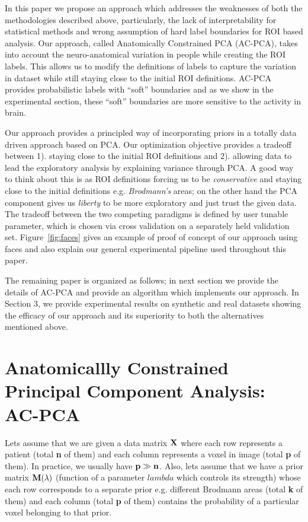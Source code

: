 \documentclass{llncs}
\begin{document}
In this paper we propose an approach which addresses the weaknesses of both the methodologies described above, particularly, the lack of interpretability for statistical methods and wrong assumption of hard label boundaries for ROI based analysis. Our approach, called Anatomically Constrained PCA (AC-PCA),  takes into account the neuro-anatomical variation in people while creating the ROI labels. This allows us to modify the definitions of labels to capture the variation in dataset while still staying close to the initial ROI definitions. AC-PCA provides probabilistic labels with ``soft'' boundaries and as we show in the experimental section, these ``soft'' boundaries are more sensitive to the activity in brain.

Our approach provides a principled way of incorporating priors in a totally data driven approach based on PCA. Our optimization objective provides a tradeoff between 1). staying close to the initial ROI definitions and 2). allowing data to lead the exploratory analysis by explaining variance through PCA. A good way to think about this is as ROI definitions forcing us to be {\em conservative} and staying close to the initial definitions e.g. {\it Brodmann's} areas; on the other hand the PCA component gives us {\em liberty} to be more exploratory and just trust the given data. The tradeoff between the two competing paradigms is defined by user tunable parameter, which is chosen via cross validation on a separately held validation set. Figure~\ref{fig:faces} gives an example of proof of concept of our approach using faces and also explain our general experimental pipeline used throughout this paper.


The remaining paper is organized as follows; in next section we provide the details of AC-PCA and provide an algorithm which implements our approach. In Section 3, we provide experimental results on synthetic and real datasets showing the efficacy of our approach and its superiority to both the alternatives mentioned above.


\section{ Anatomicallly Constrained Principal Component Analysis: AC-PCA}
Lets assume that we are given a data matrix ${\bf X}$ where each row represents a patient (total {\bf n} of them) and each column represents a voxel in image (total {\bf p} of them). In practice, we usually have ${\bf p \gg n}$. Also, lets assume that we have a prior matrix {$\bf M(\lambda)$} (function of a parameter $lambda$ which controls its strength) whose each row corresponds to a separate prior e.g. different Brodmann areas (total {\bf k} of them) and each column (total {\bf p} of them) contains the probability of a particular voxel belonging to that prior.  
\end{document}
